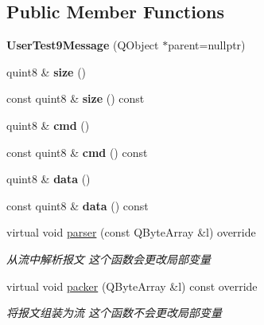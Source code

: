 \subsection*{Public Member Functions}
\begin{DoxyCompactItemize}
\item 
\mbox{\label{class_user_test9_message_aaf6e1940b0b0d9b0343a80991df12010}} 
{\bfseries User\+Test9\+Message} (Q\+Object $\ast$parent=nullptr)
\item 
\mbox{\label{class_user_test9_message_a885563f20797afcb2189e9220f6804ce}} 
quint8 \& {\bfseries size} ()
\item 
\mbox{\label{class_user_test9_message_a9d16d8e8bd14f8f0c0029208186f81a3}} 
const quint8 \& {\bfseries size} () const
\item 
\mbox{\label{class_user_test9_message_a97fb0f63b9133bd1db3b1c278c5bd5a1}} 
quint8 \& {\bfseries cmd} ()
\item 
\mbox{\label{class_user_test9_message_a7b6ffa43e7d7d195c7348160f44caf2c}} 
const quint8 \& {\bfseries cmd} () const
\item 
\mbox{\label{class_user_test9_message_ac2ddc9941a2350cca85397978ebb7783}} 
quint8 \& {\bfseries data} ()
\item 
\mbox{\label{class_user_test9_message_ad94aa98386f6c499636b2e59f5f6df48}} 
const quint8 \& {\bfseries data} () const
\item 
virtual void \mbox{\hyperlink{class_user_test9_message_ae681cf1cb8b410628887aab2c80fcdf9}{parser}} (const Q\+Byte\+Array \&l) override
\begin{DoxyCompactList}\small\item\em 从流中解析报文 这个函数会更改局部变量 \end{DoxyCompactList}\item 
virtual void \mbox{\hyperlink{class_user_test9_message_a331d2fe4866837706295952962ff41c1}{packer}} (Q\+Byte\+Array \&l) const override
\begin{DoxyCompactList}\small\item\em 将报文组装为流 这个函数不会更改局部变量 \end{DoxyCompactList}\end{DoxyCompactItemize}


